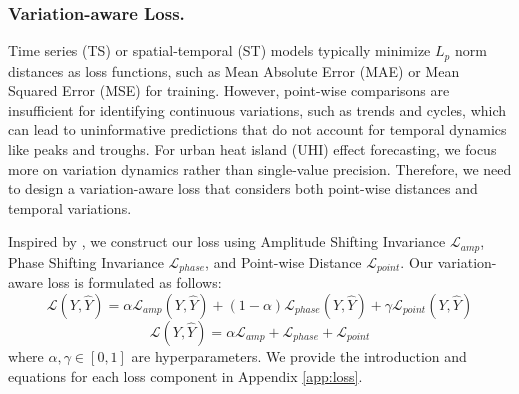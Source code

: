 \subsubsection{Variation-aware Loss.} Time series (TS) or spatial-temporal (ST) models typically minimize \(L_p\) norm distances as loss functions, such as Mean Absolute Error (MAE) or Mean Squared Error (MSE) for training. However, point-wise comparisons are insufficient for identifying continuous variations, such as trends and cycles, which can lead to uninformative predictions that do not account for temporal dynamics like peaks and troughs. For urban heat island (UHI) effect forecasting, we focus more on variation dynamics rather than single-value precision. Therefore, we need to design a variation-aware loss that considers both point-wise distances and temporal variations.

Inspired by \cite{lee2022tilde}, we construct our loss using Amplitude Shifting Invariance \(\mathcal{L}_{amp}\), Phase Shifting Invariance \(\mathcal{L}_{phase}\), and Point-wise Distance \(\mathcal{L}_{point}\). Our variation-aware loss is formulated as follows:
\begin{equation}
    \mathcal{L}(Y, \hat{Y}) = \alpha \mathcal{L}_{amp}(Y, \hat{Y}) + (1 - \alpha) \mathcal{L}_{phase}(Y, \hat{Y}) + \gamma \mathcal{L}_{point}(Y, \hat{Y})
\end{equation}
\begin{equation}
    \mathcal{L}(Y, \hat{Y}) = \alpha \mathcal{L}_{amp} +  \mathcal{L}_{phase} + \mathcal{L}_{point}
\end{equation}
where \(\alpha,\gamma \in [0,1]\) are hyperparameters. We provide the introduction and equations for each loss component in Appendix \ref{app:loss}.